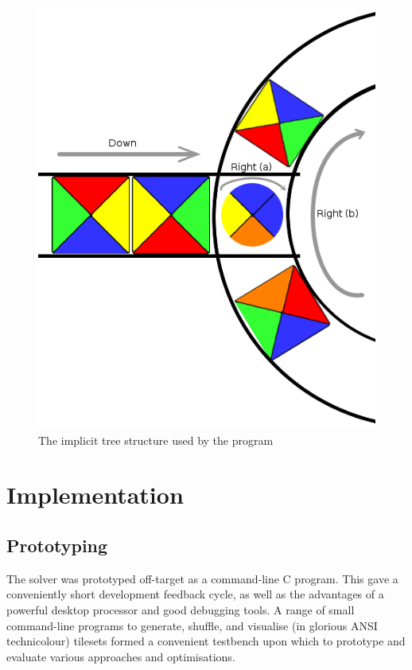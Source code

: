 \documentclass[a4paper,12pt]{article}
\begin{document}
\begin{figure}
  
  \begin{center}
    \includegraphics[scale=0.3]{spinner}
    \caption{The implicit tree structure used by the program}
  \end{center}
  
\end{figure}

\section{Implementation}

\subsection{Prototyping}

The solver was prototyped off-target as a command-line C program. This
gave a conveniently short development feedback cycle, as well as the
advantages of a powerful desktop processor and good debugging tools. A
range of small command-line programs to generate, shuffle, and
visualise (in glorious ANSI technicolour) tilesets formed a convenient
testbench upon which to prototype and evaluate various approaches and
optimisations.
\end{document}
